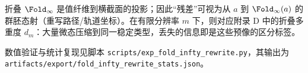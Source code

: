 \begin{remark}[残差的两种自然落点]\label{rem:residual}
折叠 $\Fold_\infty$ 是值纤维到横截面的投影；因此“残差”可视为从 $a$ 到 $\Fold_\infty(a)$ 的群胚态射（重写路径/轨道坐标）。在有限分辨率 $m$ 下，则对应附录 D 中的折叠多重度 $d_m$：大量微态压缩到同一稳定类型，丢失的信息即是这些预像的区分标签。
\end{remark}

数值验证与统计复现见脚本 \texttt{scripts/exp\_fold\_infty\_rewrite.py}，其输出为
\texttt{artifacts/export/fold\_infty\_rewrite\_stats.json}。
